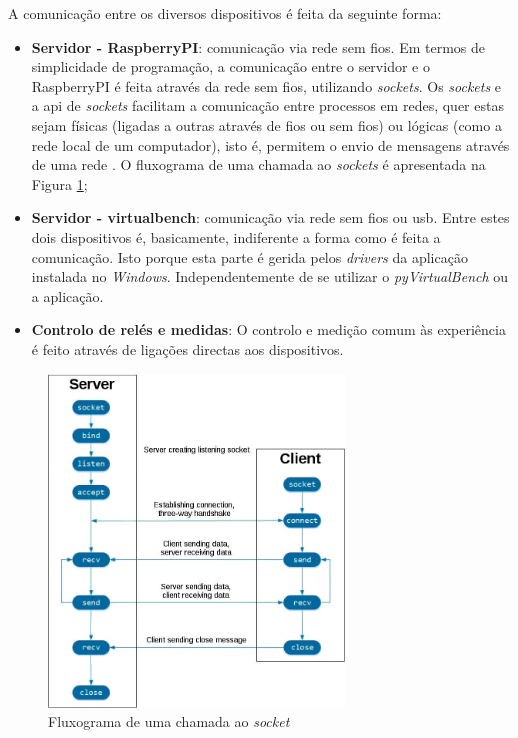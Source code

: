 A comunicação entre os diversos dispositivos é feita da seguinte forma:
\begin{itemize}
	\item \textbf{Servidor - \gls{RaspberryPI}}: comunicação via rede sem fios. Em termos de simplicidade de programação, a comunicação entre o servidor e o \gls{RaspberryPI} é feita através da rede sem fios, utilizando \textit{sockets}. Os \textit{sockets} e a \acrshort{api} de \textit{sockets} facilitam a comunicação entre processos em redes, quer estas sejam físicas (ligadas a outras através de fios ou sem fios) ou lógicas (como a rede local de um computador), isto é, permitem o envio de mensagens através de uma rede \cite{Sockets}. O fluxograma de uma chamada ao \textit{sockets} é apresentada na Figura \ref{fig:fluxogramasockets};
	\item \textbf{Servidor - \acrshort{virtualbench}}: comunicação via rede sem fios ou \acrshort{usb}. Entre estes dois dispositivos é, basicamente, indiferente a forma como é feita a comunicação. Isto porque esta parte é gerida pelos \textit{drivers} da aplicação instalada no \textit{Windows}. Independentemente de se utilizar o \textit{pyVirtualBench} ou a aplicação.
	\item \textbf{Controlo de relés e medidas}: O controlo e medição comum às experiência é feito através de ligações directas aos dispositivos.
\end{itemize}

\begin{figure}[hbtp]
	\centering
	\includegraphics[width=0.7\textwidth]{figures/socketsdiagrama.png}
	\caption{Fluxograma de uma chamada ao \textit{socket} \cite{Sockets}}
	\label{fig:fluxogramasockets}
\end{figure}

